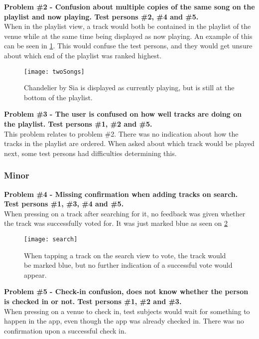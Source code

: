 \noindent\textbf{Problem \#2 - Confusion about multiple copies of the same song on the playlist
    and now playing. Test persons \#2, \#4 and \#5.}\\
  When in the playlist view, a track would both be contained in the
  playlist of the venue while at the same time being displayed as now
  playing. An example of this can be seen in \cref{fig:twoSongs}. This would confuse the test persons, and they would get
  unsure about which end of the playlist was ranked highest.\\

\begin{figure}[hbtp]
  \centering
  \texttt{[image: twoSongs]}
  \caption{Chandelier by Sia is displayed as currently playing, but is still at the bottom of the playlist.}\label{fig:twoSongs}
\end{figure}

\noindent\textbf{Problem \#3 - The user is confused on how well tracks are doing on the
    playlist. Test persons \#1, \#2 and \#5.}\\
  This problem relates to problem \#2. There was no indication about
  how the tracks in the playlist are ordered. When asked about which
  track would be played next, some test persons had difficulties
  determining this.\\

\subsubsection{Minor}
\textbf{Problem \#4 - Missing confirmation when adding tracks on search. Test persons
    \#1, \#3, \#4 and \#5.}\\
  When pressing on a track after searching for it, no feedback was
  given whether the track was successfully voted for. It was just marked blue as seen on \cref{fig:search}\\

\begin{figure}[hbtp]
  \centering
  \texttt{[image: search]}
  \caption{When tapping a track on the search view to vote, the track
    would be marked blue, but no further indication of a successful
    vote would appear.}\label{fig:search}
\end{figure}

\noindent\textbf{Problem \#5 - Check-in confusion, does not know whether the person is checked
    in or not. Test persons \#1, \#2 and \#3.}\\
  When pressing on a venue to check in, test subjects would wait for
  something to happen in the app, even though the app was already
  checked in. There was no confirmation upon a successful check in.\\

